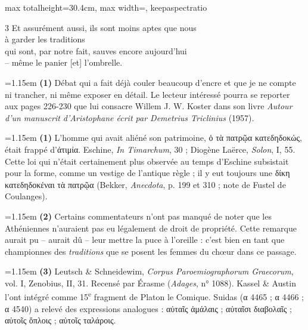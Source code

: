 \documentclass[11pt,twoside]{book}
\newcommand{\italique}[1]{\textit{#1}}
\newcommand{\nieme}[1]{#1\textsuperscript{e}}
\begin{document}
\begin{adjustbox}{max totalheight=30.4cm, max width=\textwidth, keepaspectratio}
\begin{minipage}{\textwidth}
{\begin{multicols}{3}
{Et assurément aussi, ils sont moins aptes que nous\\
à garder les traditions\\
qui sont, par notre fait, sauves encore aujourd'hui\\
-- même le panier [et] l'ombrelle.}
\par\vspace{1.5pt}
\par\vspace{1.2pt}\par\nopagebreak\vspace{1pt}\noindent\hangindent=1.15em {\color{sepiaNote}\textbf{(1)}} Débat qui a fait déjà couler beaucoup d'encre et que je ne compte ni trancher, ni même exposer en détail. Le lecteur intéressé pourra se reporter aux pages 226-230 que lui consacre Willem J. W. Koster dans son livre \italique{Autour d'un manuscrit d'Aristophane écrit par Demetrius Triclinius} (1957).
\par\vspace{1.5pt}
\noindent\hangindent=1.15em {\color{sepiaNote}\textbf{(1)}} L'homme qui avait aliéné son patrimoine, ὁ τὰ πατρῷα κατεδηδοκώς, était frappé d'ἀτιμία. Eschine, \italique{In Timarchum}, 30 ; Diogène Laërce, \italique{Solon}, I, 55. Cette loi qui n'était certainement plus observée au temps d'Eschine subsistait pour la forme, comme un vestige de l'antique règle ; il y eut toujours une δίκη κατεδηδοκέναι τὰ πατρῷα (Bekker, \italique{Anecdota}, p. 199 et 310 ; note de Fustel de Coulanges).
\par\vspace{1.5pt}
\noindent\hangindent=1.15em {\color{sepiaNote}\textbf{(2)}} Certains commentateurs n'ont pas manqué de noter que les Athéniennes n'auraient pas eu légalement de droit de propriété. Cette remarque aurait pu -- aurait dû -- leur mettre la puce à l'oreille : c'est bien en tant que championnes des \italique{traditions} que se posent les femmes du chœur dans ce passage.
\par\vspace{1.5pt}
\noindent\hangindent=1.15em {\color{sepiaNote}\textbf{(3)}} Leutsch \& Schneidewim, \italique{Corpus Paroemiographorum Graecorum}, vol. I, Zenobius, II, 31. Recensé par Érasme (\italique{Adages}, n° 1088). Kassel \& Austin l'ont intégré comme \nieme{15} fragment de Platon le Comique. Suidas (α 4465 ; α 4466 ; α 4540) a relevé des expressions analogues : αὐταῖς ἀμάλαις ; αὐταῖσι διαβολαῖς ; αὐτοῖς ὅπλοις ; αὐτοῖς ταλάροις.

\end{multicols}}
\end{minipage}
\end{adjustbox}
\end{document}
